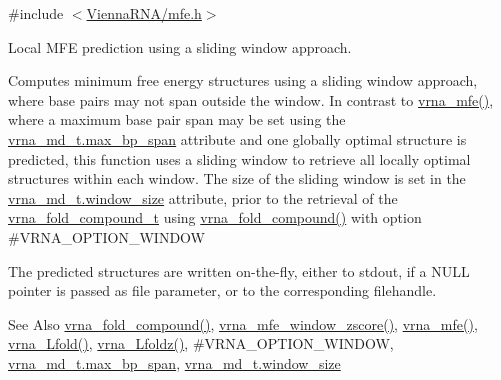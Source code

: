 {\ttfamily \#include $<$\hyperlink{mfe_8h}{Vienna\-R\-N\-A/mfe.\-h}$>$}



Local M\-F\-E prediction using a sliding window approach. 

Computes minimum free energy structures using a sliding window approach, where base pairs may not span outside the window. In contrast to \hyperlink{group__mfe__fold_gabd3b147371ccf25c577f88bbbaf159fd}{vrna\-\_\-mfe()}, where a maximum base pair span may be set using the \hyperlink{group__model__details_a659e5fcc6e8c9f1a68e7de6548eef3b0}{vrna\-\_\-md\-\_\-t.\-max\-\_\-bp\-\_\-span} attribute and one globally optimal structure is predicted, this function uses a sliding window to retrieve all locally optimal structures within each window. The size of the sliding window is set in the \hyperlink{group__model__details_abea42f9229f8d8d6bcbedef316315bfc}{vrna\-\_\-md\-\_\-t.\-window\-\_\-size} attribute, prior to the retrieval of the \hyperlink{group__fold__compound_ga1b0cef17fd40466cef5968eaeeff6166}{vrna\-\_\-fold\-\_\-compound\-\_\-t} using \hyperlink{group__fold__compound_ga6601d994ba32b11511b36f68b08403be}{vrna\-\_\-fold\-\_\-compound()} with option \#\-V\-R\-N\-A\-\_\-\-O\-P\-T\-I\-O\-N\-\_\-\-W\-I\-N\-D\-O\-W

The predicted structures are written on-\/the-\/fly, either to stdout, if a N\-U\-L\-L pointer is passed as file parameter, or to the corresponding filehandle.

\begin{DoxySeeAlso}{See Also}
\hyperlink{group__fold__compound_ga6601d994ba32b11511b36f68b08403be}{vrna\-\_\-fold\-\_\-compound()}, \hyperlink{group__local__mfe__fold_gaa4f67ae94efd08d800c17f9b53423fd6}{vrna\-\_\-mfe\-\_\-window\-\_\-zscore()}, \hyperlink{group__mfe__fold_gabd3b147371ccf25c577f88bbbaf159fd}{vrna\-\_\-mfe()}, \hyperlink{group__local__mfe__fold_ga4918cce52bf69c1913cda503b2ac75d8}{vrna\-\_\-\-Lfold()}, \hyperlink{group__local__mfe__fold_ga27fddda5fc63eb49c861e38845fc34b4}{vrna\-\_\-\-Lfoldz()}, \#\-V\-R\-N\-A\-\_\-\-O\-P\-T\-I\-O\-N\-\_\-\-W\-I\-N\-D\-O\-W, \hyperlink{group__model__details_a659e5fcc6e8c9f1a68e7de6548eef3b0}{vrna\-\_\-md\-\_\-t.\-max\-\_\-bp\-\_\-span}, \hyperlink{group__model__details_abea42f9229f8d8d6bcbedef316315bfc}{vrna\-\_\-md\-\_\-t.\-window\-\_\-size}
\end{DoxySeeAlso}


